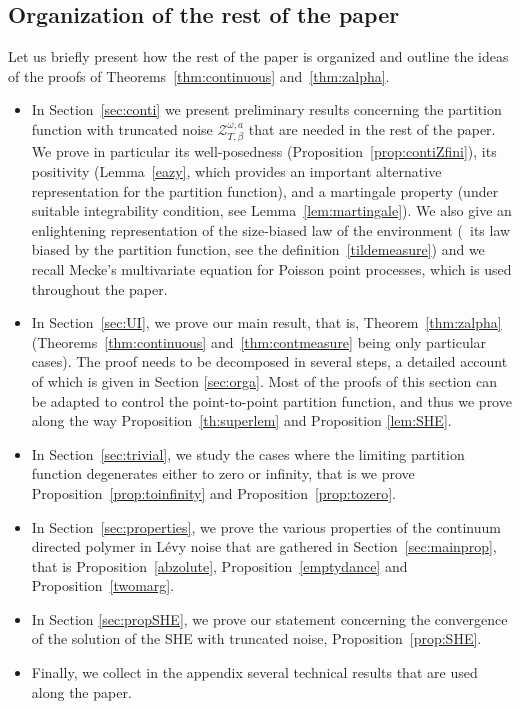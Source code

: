 \documentclass[JEP,XML,SOM,Unicode,published]{cedram}
\let\mathcal\mathscr
\theoremstyle{definition}
\newcommand{\cZ}{{\ensuremath{\mathcal Z}} }
\let\gb\beta
\let\go\omega
\begin{document}
\subsection{Organization of the rest of the paper}

Let us briefly present how the rest of the paper is organized and outline the ideas of the proofs of Theorems~\ref{thm:continuous}
and~\ref{thm:zalpha}.

\begin{itemize}
\item
In Section~\ref{sec:conti} we present preliminary
results concerning the partition function with truncated noise $\cZ_{T,\gb}^{\go,a}$ that are needed in the rest of the paper.
We prove in particular its well-posedness (Proposition~\ref{prop:contiZfini}), its positivity (Lemma~\ref{eazy}, which provides an important alternative representation for the partition function),
and a martingale property (under suitable integrability condition, see Lemma~\ref{lem:martingale}).
We also give an enlightening representation of
the size-biased law of the environment (\ie \ its law biased by the partition function, see the definition~\eqref{tildemeasure})
and we recall Mecke's multivariate equation for Poisson point processes, which is used throughout the paper.

\item
In Section~\ref{sec:UI}, we prove our main result, that is, Theorem~\ref{thm:zalpha}
(Theorems~\ref{thm:continuous} and~\ref{thm:contmeasure} being only particular cases).
The proof needs to be decomposed in several steps, a detailed account of which is given in Section \ref{sec:orga}. Most of the proofs of this section can be adapted to control the point-to-point
partition function, and thus we prove along the way Proposition~\ref{th:superlem} and Proposition \ref{lem:SHE}.

\item
In Section~\ref{sec:trivial}, we study the cases where the limiting partition function degenerates either to zero or infinity, that is we prove Proposition~\ref{prop:toinfinity} and
Proposition~\ref{prop:tozero}.

\item
In Section~\ref{sec:properties}, we prove the various properties of the continuum directed polymer in Lévy noise
that are gathered in Section~\ref{sec:mainprop},
that is
Proposition~\ref{abzolute},
Proposition~\ref{emptydance}
and
Proposition~\ref{twomarg}.

\item
In Section \ref{sec:propSHE},
we prove our statement concerning the convergence of the solution of the SHE with truncated noise, Proposition~\ref{prop:SHE}.

\item
Finally, we collect in the appendix several technical results that are used along the paper.
\end{itemize}
\end{document}
